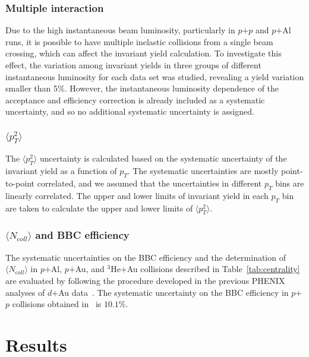 \documentclass[twocolumn,letterpaper,aps,prc,longbibliography,superscriptaddress,nofootinbib,floatfix]{revtex4-1}
\newcommand{\pt}{\mbox{$p_T$}\xspace}
\newcommand{\meanncoll}{\mbox{$\langle N_{\mathrm coll} \rangle$}\xspace}
\newcommand{\meanptsq}{\mbox{$\langle p_T^2 \rangle$}\xspace}
\newcommand{\pp}{\mbox{$p$$+$$p$}\xspace}
\newcommand{\dau}{\mbox{$d$$+$Au}\xspace}
\newcommand{\pau}{\mbox{$p$$+$Au}\xspace}
\newcommand{\pal}{\mbox{$p$$+$Al}\xspace}
\newcommand{\heau}{\mbox{$^{3}$He$+$Au}\xspace}
\begin{document}
\subsubsection{Multiple interaction}

Due to the high instantaneous beam luminosity, particularly in \pp and 
\pal runs, it is possible to have multiple inelastic collisions from a 
single beam crossing, which can affect the invariant yield calculation. 
To investigate this effect, the variation among invariant 
yields in three groups of different instantaneous luminosity for each 
data set was studied, revealing a yield variation smaller than 5\%. 
However, the instantaneous luminosity dependence of the acceptance and 
efficiency correction is already included as a systematic uncertainty, 
and so no additional systematic uncertainty is assigned.

\subsubsection{\meanptsq}

The \meanptsq uncertainty is calculated based on the systematic 
uncertainty of the invariant yield as a function of \pt. The systematic 
uncertainties are mostly point-to-point correlated, and we assumed that 
the uncertainties in different \pt bins are linearly correlated. The 
upper and lower limits of invariant yield in each \pt bin are taken to 
calculate the upper and lower limits of \meanptsq.

\subsubsection{\meanncoll and BBC efficiency}

The systematic uncertainties on the BBC efficiency and the determination 
of \meanncoll in \pal, \pau, and \heau collisions described in 
Table~\ref{tab:centrality} are evaluated by following the procedure 
developed in the previous PHENIX analyses of \dau 
data~\cite{Adare:2013nff}. The systematic uncertainty on the BBC 
efficiency in \pp collisions obtained in~\cite{Adler:2003pb} is 
$10.1\%$.


\section{Results}
\end{document}
